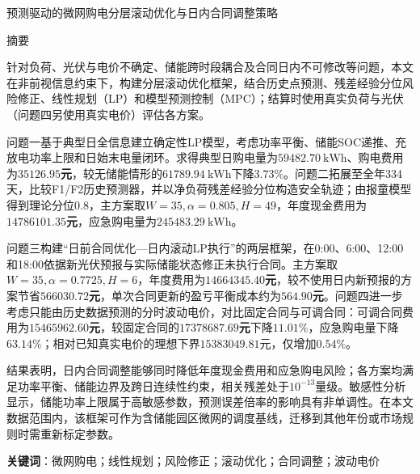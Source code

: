 \documentclass[12pt,a4paper,fontset=fandol]{ctexart}
\newcommand{\res}[1]{\textbf{\boldmath #1}}
\begin{document}
\setcounter{page}{1}
\begin{center}
    \heiti{} 预测驱动的微网购电分层滚动优化与日内合同调整策略
\end{center}
\vspace{10pt}
\begin{center}
    \heiti{} 摘\quad 要
\end{center}
\vspace{5pt}
\setlength{\parindent}{2em}
\noindent\hspace*{2em}针对负荷、光伏与电价不确定、储能跨时段耦合及合同日内不可修改等问题，本文在非前视信息约束下，构建分层滚动优化框架，结合历史点预测、残差经验分位风险修正、线性规划（LP）和模型预测控制（MPC）；结算时使用真实负荷与光伏（问题四另使用真实电价）评估各方案。

\noindent\hspace*{2em}问题一基于典型日全信息建立确定性LP模型，考虑功率平衡、储能SOC递推、充放电功率上限和日始末电量闭环。求得典型日购电量为\res{$59482.70\ \mathrm{kWh}$}、购电费用为\res{$35126.95$元}，较无储能情形的\res{$61789.94\ \mathrm{kWh}$}下降$3.73\%$。问题二拓展至全年334天，比较F1/F2历史预测器，并以净负荷残差经验分位构造安全轨迹；由报童模型得到理论分位$0.8$，主方案取$W=35,\alpha=0.805,H=49$，年度现金费用为\res{$14786101.35$元}，应急购电量为\res{$245483.29\ \mathrm{kWh}$}。

\noindent\hspace*{2em}问题三构建“日前合同优化—日内滚动LP执行”的两层框架，在0:00、6:00、12:00和18:00依据新光伏预报与实际储能状态修正未执行合同。主方案取$W=35,\alpha=0.7725,H=6$，年度费用为\res{$14664345.40$元}，较不使用日内新预报的方案节省\res{$566030.72$元}，单次合同更新的盈亏平衡成本约为\res{$564.90$元}。问题四进一步考虑只能由历史数据预测的分时波动电价，对比固定合同与可调合同：可调合同费用为\res{$15465962.60$元}，较固定合同的\res{$17378687.69$元}下降$11.01\%$，应急购电量下降$63.14\%$；相对已知真实电价的理想下界$15383049.81$元，仅增加$0.54\%$。

\noindent\hspace*{2em}结果表明，日内合同调整能够同时降低年度现金费用和应急购电风险；各方案均满足功率平衡、储能边界及跨日连续性约束，相关残差处于$10^{-13}$量级。敏感性分析显示，储能功率上限属于高敏感参数，预测误差倍率的影响具有非单调性。在本文数据范围内，该框架可作为含储能园区微网的调度基线，迁移到其他年份或市场规则时需重新标定参数。
\par\noindent\textbf{关键词}：微网购电；线性规划；风险修正；滚动优化；合同调整；波动电价
\end{document}
